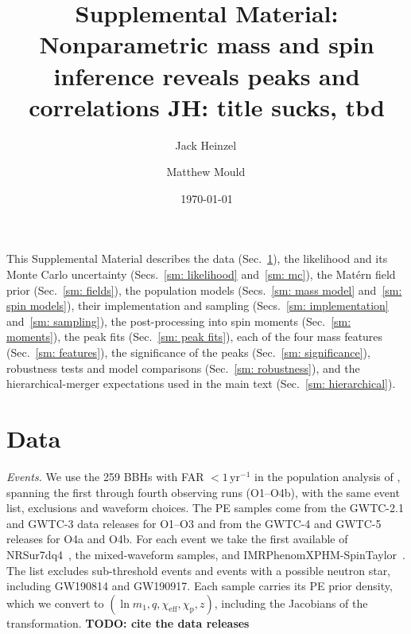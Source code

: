 \documentclass[%
 onecolumn,
 amsmath,amssymb,
 aps,
 prl,
 nofootinbib,nobibnotes,
]{revtex4-2}
\newcommand{\chieff}{\ensuremath{\chi_{\mathrm{eff}}}}
\newcommand{\chip}{\ensuremath{\chi_{\mathrm{p}}}}
\newcommand{\peryear}{\ensuremath{\,\mathrm{yr}^{-1}}}
\newcommand{\todo}[1]{{\color{Blue}\bf TODO: #1}}
\newcommand{\jh}[1]{{\color{orange}JH: #1}}
\begin{document}
\title{Supplemental Material: Nonparametric mass and spin inference reveals peaks and correlations \jh{title sucks, tbd}}

\author{Jack Heinzel\,}

\author{Matthew Mould\,\orcidlink{}}


\date{\today}



\maketitle

\setcounter{equation}{0}
\setcounter{figure}{0}
\setcounter{table}{0}
\setcounter{section}{0}
\renewcommand{\theequation}{S\arabic{equation}}
\renewcommand{\thefigure}{S\arabic{figure}}
\renewcommand{\thetable}{S\arabic{table}}
\renewcommand{\thesection}{S\arabic{section}}


This Supplemental Material describes the data (Sec.~\ref{sm: data}), the likelihood and its Monte Carlo uncertainty (Secs.~\ref{sm: likelihood} and~\ref{sm: mc}), the Mat\'ern field prior (Sec.~\ref{sm: fields}), the population models (Secs.~\ref{sm: mass model} and~\ref{sm: spin models}), their implementation and sampling (Secs.~\ref{sm: implementation} and~\ref{sm: sampling}), the post-processing into spin moments (Sec.~\ref{sm: moments}), the peak fits (Sec.~\ref{sm: peak fits}), each of the four mass features (Sec.~\ref{sm: features}), the significance of the peaks (Sec.~\ref{sm: significance}), robustness tests and model comparisons (Sec.~\ref{sm: robustness}), and the hierarchical-merger expectations used in the main text (Sec.~\ref{sm: hierarchical}).

\section{Data}
\label{sm: data}

\textit{Events.} We use the 259 \acp{BBH} with \ac{FAR} $< 1\peryear$ in the population analysis of \citet{LIGOScientific:2026ctl}, spanning the first through fourth observing runs (O1--O4b), with the same event list, exclusions and waveform choices. The \ac{PE} samples come from the GWTC-2.1 and GWTC-3 data releases for O1--O3 and from the GWTC-4 and GWTC-5 releases for O4a and O4b. For each event we take the first available of NRSur7dq4~\cite{Varma:2019csw}, the mixed-waveform samples, and IMRPhenomXPHM-SpinTaylor~\cite{Pratten:2020ceb}. The list excludes sub-threshold events and events with a possible neutron star, including GW190814 and GW190917. Each sample carries its \ac{PE} prior density, which we convert to $(\ln m_1, q, \chieff, \chip, z)$, including the Jacobians of the transformation. \todo{cite the data releases}
\end{document}
